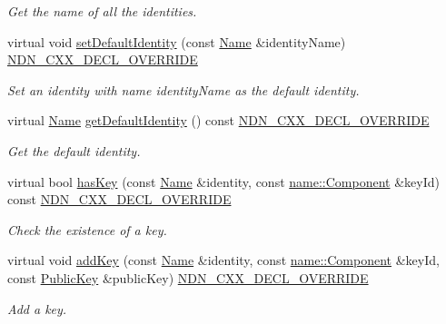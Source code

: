 \begin{DoxyCompactItemize}
\begin{DoxyCompactList}\small\item\em Get the name of all the identities. \end{DoxyCompactList}\item 
virtual void \hyperlink{classndn_1_1security_1_1PibMemory_a4e5f8bd41d7f8e51c0ba2865550f6c69}{set\+Default\+Identity} (const \hyperlink{classndn_1_1Name}{Name} \&identity\+Name) \hyperlink{ndn-cxx_2src_2common_8hpp_a901daa44edd42d3f44df61d77277d57f}{N\+D\+N\+\_\+\+C\+X\+X\+\_\+\+D\+E\+C\+L\+\_\+\+O\+V\+E\+R\+R\+I\+DE}
\begin{DoxyCompactList}\small\item\em Set an identity with name {\ttfamily identity\+Name} as the default identity. \end{DoxyCompactList}\item 
virtual \hyperlink{classndn_1_1Name}{Name} \hyperlink{classndn_1_1security_1_1PibMemory_a04c12353e2b94f87f8d5a86d011a8aa1}{get\+Default\+Identity} () const \hyperlink{ndn-cxx_2src_2common_8hpp_a901daa44edd42d3f44df61d77277d57f}{N\+D\+N\+\_\+\+C\+X\+X\+\_\+\+D\+E\+C\+L\+\_\+\+O\+V\+E\+R\+R\+I\+DE}
\begin{DoxyCompactList}\small\item\em Get the default identity. \end{DoxyCompactList}\item 
virtual bool \hyperlink{classndn_1_1security_1_1PibMemory_aa7c86b37d300af284318006e7f80da8c}{has\+Key} (const \hyperlink{classndn_1_1Name}{Name} \&identity, const \hyperlink{classndn_1_1name_1_1Component}{name\+::\+Component} \&key\+Id) const \hyperlink{ndn-cxx_2src_2common_8hpp_a901daa44edd42d3f44df61d77277d57f}{N\+D\+N\+\_\+\+C\+X\+X\+\_\+\+D\+E\+C\+L\+\_\+\+O\+V\+E\+R\+R\+I\+DE}
\begin{DoxyCompactList}\small\item\em Check the existence of a key. \end{DoxyCompactList}\item 
virtual void \hyperlink{classndn_1_1security_1_1PibMemory_adc3eba49f7a11410a6369e93e507a84c}{add\+Key} (const \hyperlink{classndn_1_1Name}{Name} \&identity, const \hyperlink{classndn_1_1name_1_1Component}{name\+::\+Component} \&key\+Id, const \hyperlink{classndn_1_1PublicKey}{Public\+Key} \&public\+Key) \hyperlink{ndn-cxx_2src_2common_8hpp_a901daa44edd42d3f44df61d77277d57f}{N\+D\+N\+\_\+\+C\+X\+X\+\_\+\+D\+E\+C\+L\+\_\+\+O\+V\+E\+R\+R\+I\+DE}
\begin{DoxyCompactList}\small\item\em Add a key. \end{DoxyCompactList}\item 

\end{DoxyCompactItemize}

